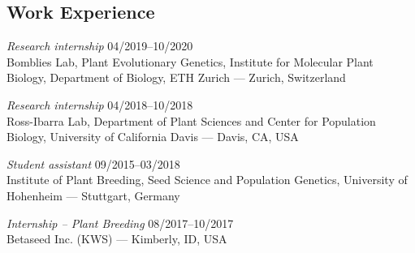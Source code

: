 \documentclass[margin]{res}
\begin{document}
\begin{resume}
\section{Work Experience}

{\sl Research internship} \hfill 04/2019--10/2020 \\
Bomblies Lab, Plant Evolutionary Genetics, Institute for Molecular Plant Biology, Department of Biology, ETH Zurich --- Zurich, Switzerland


{\sl Research internship} \hfill 04/2018--10/2018 \\
Ross-Ibarra Lab, Department of Plant Sciences and Center for Population Biology, University of California Davis --- Davis, CA, USA



{\sl Student assistant} \hfill 09/2015--03/2018 \\
Institute of Plant Breeding, Seed Science and Population Genetics, University of Hohenheim --- Stuttgart, Germany



{\sl Internship -- Plant Breeding} \hfill 08/2017--10/2017 \\
Betaseed Inc. (KWS) --- Kimberly, ID, USA



\end{resume}
\end{document}

